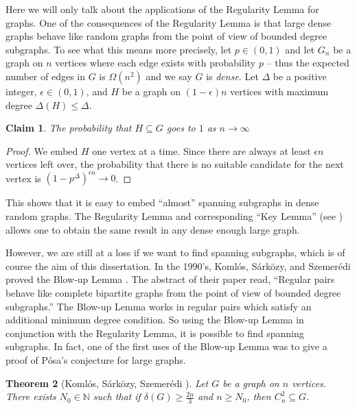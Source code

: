 \documentclass[oneside,12pt]{memoir}
\newtheorem{theorem}{Theorem}[section]
\newtheorem{claim}[theorem]{Claim}
\newcommand{\ep}{\epsilon}
\newcommand{\KSS}{Koml\'{o}s, S\'{a}rk\"{o}zy, Szemer\'{e}di }
\newcommand{\KSaS}{Koml\'{o}s, S\'{a}rk\"{o}zy, and Szemer\'{e}di }
\begin{document}
Here we will only talk about the applications of the Regularity Lemma for graphs.  One of the consequences of the Regularity Lemma is that large dense graphs behave like random graphs from the point of view of bounded degree
subgraphs.  To see what this means more precisely, let $p\in (0,1)$
and let $G_n$ be a graph on $n$ vertices where each edge exists with
probability $p$ -- thus the expected number of edges in $G$ is $\Omega(n^2)$ and we say $G$ is \emph{dense}.  Let $\Delta$ be a positive integer, $\ep\in (0,1)$, and $H$ be a graph on $(1-\ep)n$ vertices with maximum
degree $\Delta(H)\leq \Delta$.  
\begin{claim}
The probability that $H\subseteq G$ goes to $1$ as $n\to \infty$
\end{claim}

\begin{proof}
We embed $H$ one vertex at a time. Since there are always at least $\ep n$ vertices left over, the probability that there is no suitable candidate for the next vertex is
$(1-p^\Delta)^{\ep n}\to 0$.
\end{proof}
 
This shows that it is easy to embed ``almost'' spanning subgraphs in
dense random graphs.  The Regularity Lemma and corresponding ``Key Lemma'' (see \cite{KS}) allows one to obtain the same result in any dense enough large graph.

However, we are still at a loss if we want to find spanning subgraphs,
which is of course the aim of this dissertation.  In the 1990's, \KSaS proved
the Blow-up Lemma \cite{KSSbu}. The abstract of their paper read, ``Regular pairs behave
like complete bipartite graphs from the point of view of bounded
degree subgraphs.''  The Blow-up Lemma works in regular pairs which
satisfy an additional minimum degree condition.  So using the Blow-up
Lemma in conjunction with the Regularity Lemma, it is possible to find
spanning subgraphs.  In fact, one of the first uses of the Blow-up
Lemma was to give a proof of P\'osa's conjecture for large graphs.

\begin{theorem}[\KSS \cite{KSSp}]
Let $G$ be a graph on $n$ vertices.  There exists $N_0\in \mathbb{N}$ such that if $\delta(G)\geq \frac{2n}{3}$ and $n\geq N_0$, then $C_n^2\subseteq G$.
\end{theorem}
\end{document}
